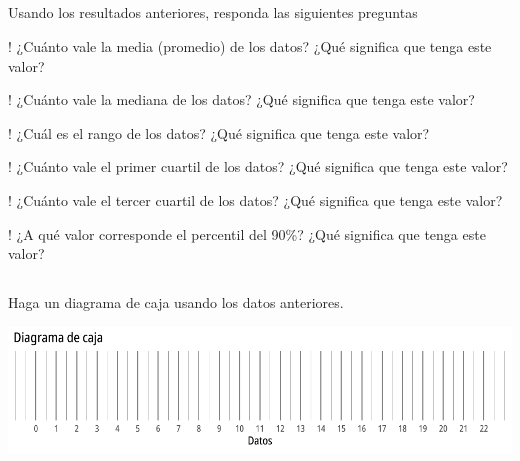 \documentclass{cdplf-prueba}
\begin{document}
\subsection{}
Usando los resultados anteriores, responda las siguientes preguntas
\begin{tasks}[label={\tcbox[colback=black!60, colframe=black!60, coltext=white, on line, boxsep=0pt, left=3pt, right=3pt, top=2pt, bottom=2pt]{\sffamily\bfseries\alph*}},
item-indent=1.2cm,column-sep=20pt,label-offset=0.3cm,label-width=15pt,after-item-skip=10pt]
    \task! ¿Cuánto vale la media (promedio) de los datos? ¿Qué significa que tenga este valor? \begin{lineas}[height=1.5cm]\end{lineas}
    \task! ¿Cuánto vale la mediana de los datos? ¿Qué significa que tenga este valor? \begin{lineas}[height=1.5cm]\end{lineas}
    \task! ¿Cuál es el rango de los datos? ¿Qué significa que tenga este valor? \begin{lineas}[height=1.5cm]\end{lineas}
    \task! ¿Cuánto vale el primer cuartil de los datos? ¿Qué significa que tenga este valor? \begin{lineas}[height=1.5cm]\end{lineas}
    \task! ¿Cuánto vale el tercer cuartil de los datos? ¿Qué significa que tenga este valor? \begin{lineas}[height=1.5cm]\end{lineas}
    \task! ¿A qué valor corresponde el percentil del 90\%? ¿Qué significa que tenga este valor? \begin{lineas}[height=1.5cm]\end{lineas}
\end{tasks}
\subsection{}

Haga un diagrama de caja usando los datos anteriores.
\begin{center}\includegraphics{diagrama_caja_vacio_1.pdf}\end{center}
\end{document}
